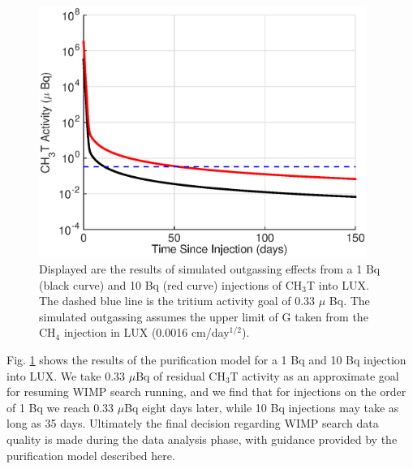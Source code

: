 \begin{figure}[h!]
\centering
\includegraphics[width=0.95\textwidth]{fig/LUX_og_lim.eps}
\caption{Displayed are the results of simulated outgassing effects from a 1 Bq (black curve) and 10 Bq (red curve) injections of CH$_3$T into LUX. The dashed blue line is the tritium activity goal of 0.33 $\mu$ Bq. The simulated outgassing assumes the upper limit of G taken from the CH$_4$ injection in LUX (0.0016 cm/day$^{1/2}$).}
\label{fig:tau_var}
\end{figure}

Fig. \ref{fig:tau_var} shows the results of the purification model for a 1 Bq and 10 Bq injection into LUX. We take 0.33 $\mu$Bq of residual CH$_3$T activity as an approximate goal for resuming WIMP search running, and we find that for injections on the order of 1 Bq we reach 0.33 $\mu$Bq eight days later, while 10 Bq injections may take as long as 35 days.  Ultimately the final decision regarding WIMP search data quality is made during the data analysis phase, with guidance provided by the purification model described here.